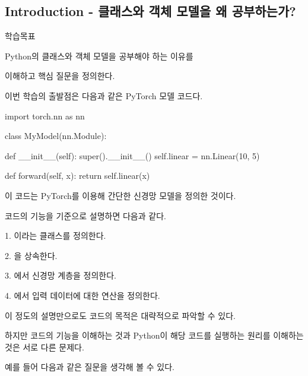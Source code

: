 

\subsection{Introduction - 클래스와 객체 모델을 왜 공부하는가?}

\begin{dhknote}
\begin{dhksmry}[centered]
학습목표
\end{dhksmry}
\end{dhknote}

\begin{dhksmry}[centered]
Python의 클래스와 객체 모델을 공부해야 하는 이유를

이해하고 핵심 질문을 정의한다.
\end{dhksmry}

이번 학습의 출발점은 다음과 같은 PyTorch 모델 코드다.

\begin{dhkcode}
import torch.nn as nn


class MyModel(nn.Module):

    def __init__(self):
        super().__init__()
        self.linear = nn.Linear(10, 5)

    def forward(self, x):
        return self.linear(x)
\end{dhkcode}

이 코드는 PyTorch를 이용해 간단한 신경망 모델을 정의한 것이다.

코드의 기능을 기준으로 설명하면 다음과 같다.

\begin{dhksmry}
    1. 이라는 클래스를 정의한다.

    2. 을 상속한다.

    3. 에서 신경망 계층을 정의한다.

    4. 에서 입력 데이터에 대한 연산을 정의한다.
\end{dhksmry}

이 정도의 설명만으로도 코드의 목적은 대략적으로 파악할 수 있다.

하지만 코드의 기능을 이해하는 것과 Python이 해당 코드를 실행하는 원리를 이해하는 것은 서로 다른 문제다.

예를 들어 다음과 같은 질문을 생각해 볼 수 있다.

